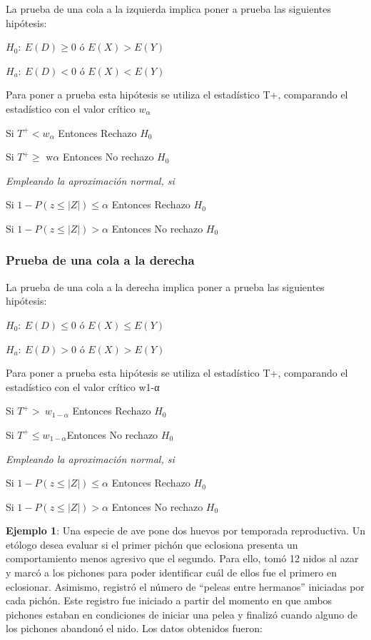 \documentclass[]{book}
\theoremstyle{definition}
\theoremstyle{definition}
\theoremstyle{definition}
\theoremstyle{remark}
\begin{document}
La prueba de una cola a la izquierda implica poner a prueba las
siguientes hipótesis:

\(H_{0}:\ E\left( D \right) \geq 0\) ó \(E\left( X \right) > E(Y)\)

\(H_{a}:\ E(D) < 0\) ó \(E(X) < E(Y)\)

Para poner a prueba esta hipótesis se utiliza el estadístico T+,
comparando el estadístico con el valor crítico \(w_{\alpha}\)

Si \(T^{+} < w_{\alpha}\) Entonces Rechazo \(H_{0}\)

Si \(T^{+} \geq \text{\ w}\alpha\) Entonces No rechazo \(H_{0}\)

\emph{Empleando la aproximación normal, si}

Si \(1 - P\left( z \leq \left| Z \right| \right) \leq \alpha\) Entonces
Rechazo \(H_{0}\)

Si \(1 - P\left( z \leq \left| Z \right| \right) > \alpha\) Entonces No
rechazo \(H_{0}\)

\hypertarget{prueba-de-una-cola-a-la-derecha-1}{%
\subsubsection{Prueba de una cola a la
derecha}\label{prueba-de-una-cola-a-la-derecha-1}}

La prueba de una cola a la derecha implica poner a prueba las siguientes
hipótesis:

\(H_{0}:\ E\left( D \right) \leq 0\) ó \(E\left( X \right) \leq E(Y)\)

\(H_{a}:\ E(D) > 0\) ó \(E(X) > E(Y)\)

Para poner a prueba esta hipótesis se utiliza el estadístico T+,
comparando el estadístico con el valor crítico w1-α

Si \(T^{+} > \ w_{1 - \alpha}\) Entonces Rechazo \(H_{0}\)

Si \(T^{+}\leq w_{1 - \alpha}\)Entonces No rechazo \(H_{0}\)

\emph{Empleando la aproximación normal, si}

Si \(1 - P\left( z \leq \left| Z \right| \right) \leq \alpha\) Entonces
Rechazo \(H_{0}\)

Si \(1 - P\left( z \leq \left| Z \right| \right) > \alpha\) Entonces No
rechazo \(H_{0}\)

\textbf{Ejemplo 1}: Una especie de ave pone dos huevos por temporada
reproductiva. Un etólogo desea evaluar si el primer pichón que eclosiona
presenta un comportamiento menos agresivo que el segundo. Para ello,
tomó 12 nidos al azar y marcó a los pichones para poder identificar cuál
de ellos fue el primero en eclosionar. Asimismo, registró el número de
``peleas entre hermanos'' iniciadas por cada pichón. Este registro fue
iniciado a partir del momento en que ambos pichones estaban en
condiciones de iniciar una pelea y finalizó cuando alguno de los
pichones abandonó el nido. Los datos obtenidos fueron:
\end{document}
